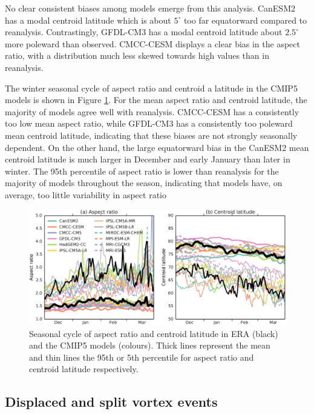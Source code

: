 No clear consistent biases among models emerge from this analysis. CanESM2 has a
modal centroid latitude which is about $5^{\circ}$ too far equatorward compared
to reanalysis. Contrastingly, GFDL-CM3 has a modal centroid latitude about
$2.5^{\circ}$ more poleward than observed. CMCC-CESM displays a clear bias in
the aspect ratio, with a distribution much less skewed towards high values than
in reanalysis.

The winter seasonal cycle of aspect ratio and centroid a latitude in the CMIP5
models is shown in Figure \ref{fig:cmip5_moments_stats_seas}. For the mean
aspect ratio and centroid latitude, the majority of models agree well with
reanalysis. CMCC-CESM has a consistently too low mean aspect ratio, while
GFDL-CM3 has a consistently too poleward mean centroid latitude, indicating that
these biases are not strongly seasonally dependent. On the other hand, the large
equatorward bias in the CanESM2 mean centroid latitude is much larger in
December and early January than later in winter. The 95th percentile of aspect
ratio is lower than reanalysis for the majority of models throughout the season,
indicating that models have, on average, too little variability in aspect ratio
 
\begin{figure}
 \centering
 \noindent\includegraphics[width=\textwidth]{figures/chapter-models/moments_seasonal_stats.pdf}
 \caption[Seasonal cycle of moment diagnostics in the CMIP5 models]{Seasonal
   cycle of aspect ratio and centroid latitude in ERA (black) and the CMIP5
   models (colours). Thick lines represent the mean and thin lines the 95th or
   5th percentile for aspect ratio and centroid latitude respectively.}
 \label{fig:cmip5_moments_stats_seas}
\end{figure}


\subsection{Displaced and split vortex events}

